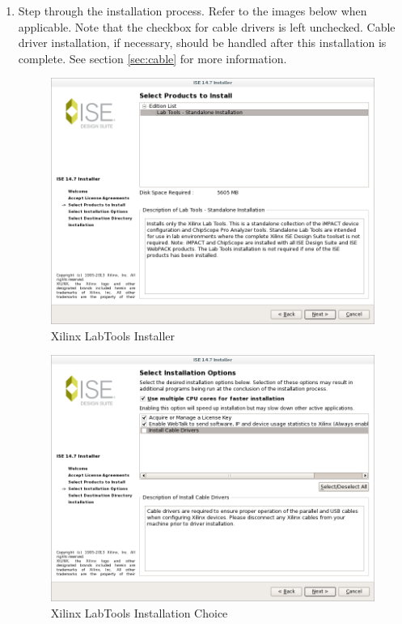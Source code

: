 \begin{flushleft}
\begin{flushleft}
\begin{enumerate}
\item Step through the installation process. Refer to the images below when applicable. Note that the checkbox for cable drivers is left unchecked. Cable driver installation, if necessary, should be handled after this installation is complete. See section \ref{sec:cable} for more information.
\begin{figure}[H]
	\centerline{\includegraphics[scale=0.4]{figures/xilinx_labtools_install}}
	\caption{Xilinx LabTools Installer}
\end{figure}
\begin{figure}[H]
	\centerline{\includegraphics[scale=0.4]{figures/xilinx_labtools_choose_installation}}
	\caption{Xilinx LabTools Installation Choice}

\end{figure}
\end{enumerate}
\end{flushleft}
\end{flushleft}
